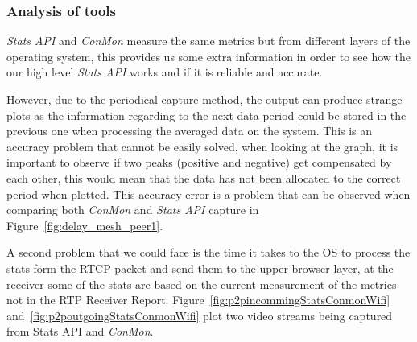 \subsubsection{Analysis of tools}

{\it Stats API} and {\it ConMon} measure the same metrics but from different layers of the operating system, this provides us some extra information in order to see how the our high level {\it Stats API} works and if it is reliable and accurate.

However, due to the periodical capture method, the output can produce strange plots as the information regarding to the next data period could be stored in the previous one when processing the averaged data on the system. This is an accuracy problem that cannot be easily solved, when looking at the graph, it is important to observe if two peaks (positive and negative) get compensated by each other, this would mean that the data has not been allocated to the correct period when plotted. This accuracy error is a problem that can be observed when comparing both {\it ConMon} and {\it Stats API} capture in Figure~\ref{fig:delay_mesh_peer1}. 

A second problem that we could face is the time it takes to the OS to process the stats form the RTCP packet and send them to the upper browser layer, at the receiver some of the stats are based on the current measurement of the metrics not in the RTP Receiver Report. Figure~\ref{fig:p2pincommingStatsConmonWifi} and~\ref{fig:p2poutgoingStatsConmonWifi} plot two video streams being captured from Stats API and {\it ConMon}.

